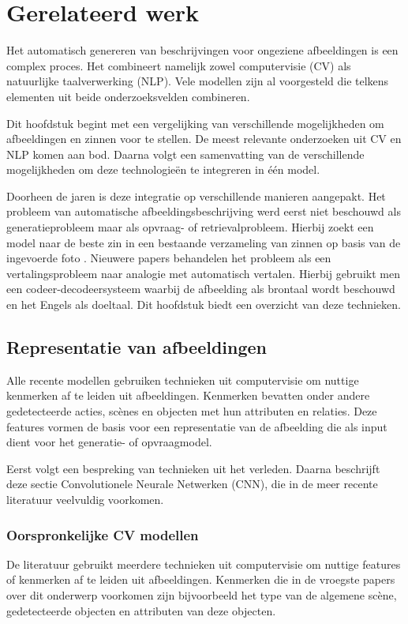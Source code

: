 \chapter{Gerelateerd werk}
\label{hoofdstuk:related}
Het automatisch genereren van beschrijvingen voor ongeziene afbeeldingen is een complex proces. Het combineert namelijk zowel computervisie (CV) als natuurlijke taalverwerking (NLP). Vele modellen zijn al voorgesteld die telkens elementen uit beide onderzoeksvelden combineren. 

Dit hoofdstuk begint met een vergelijking van verschillende mogelijkheden om afbeeldingen en zinnen voor te stellen. De meest relevante onderzoeken uit CV en NLP komen aan bod. Daarna volgt een samenvatting van de verschillende mogelijkheden om deze technologie\"en te integreren in \'e\'en model. 

Doorheen de jaren is deze integratie op verschillende manieren aangepakt. Het probleem van automatische afbeeldingsbeschrijving werd eerst niet beschouwd als generatieprobleem maar als opvraag- of retrievalprobleem. Hierbij zoekt een model naar de beste zin in een bestaande verzameling van zinnen op basis van de ingevoerde foto \cite{Hodosh2013}. Nieuwere papers behandelen het probleem als een vertalingsprobleem naar analogie met automatisch vertalen. Hierbij gebruikt men een codeer-decodeersysteem waarbij de afbeelding als brontaal wordt beschouwd en het Engels als doeltaal. Dit hoofdstuk biedt een overzicht van deze technieken.

\section{Representatie van afbeeldingen}
Alle recente modellen gebruiken technieken uit computervisie om nuttige kenmerken af te leiden uit afbeeldingen. Kenmerken bevatten onder andere gedetecteerde acties, sc\`enes en objecten met hun attributen en relaties\cite{Bernardi}. Deze features vormen de basis voor een representatie van de afbeelding die als input dient voor het generatie- of opvraagmodel.

Eerst volgt een bespreking van technieken uit het verleden. Daarna beschrijft deze sectie Convolutionele Neurale Netwerken (CNN), die in de meer recente literatuur veelvuldig voorkomen.


\subsection{Oorspronkelijke CV modellen}
De literatuur gebruikt meerdere technieken uit computervisie om nuttige features of kenmerken af te leiden uit afbeeldingen. Kenmerken die in de vroegste papers over dit onderwerp voorkomen zijn bijvoorbeeld het type van de algemene sc\`ene, gedetecteerde objecten en attributen van deze objecten\cite{Farhadi2010,Patterson2014,Yang2011}.

